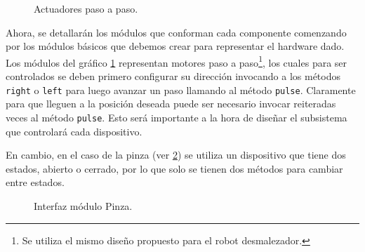 \begin{figure}[h]
\caption{Actuadores paso a paso.}
\label{estructuraActuadores}
\begin{center}
\end{center}
\end{figure}
Ahora, se detallarán los módulos que conforman cada componente comenzando por los módulos básicos que debemos crear para representar el hardware dado. Los módulos del gráfico \ref{estructuraActuadores} representan motores paso a paso\footnote{Se utiliza el mismo diseño propuesto para el robot desmalezador\cite{paperPomponio}.}, los cuales para ser controlados se deben primero configurar su dirección invocando a los métodos \verb|right| o \verb|left| para luego avanzar un paso llamando al método \verb|pulse|. Claramente para que lleguen a la posición deseada puede ser necesario invocar reiteradas veces al método \verb|pulse|. Esto será importante a la hora de diseñar el subsistema que controlará cada dispositivo.

En cambio, en el caso de la pinza (ver \ref{moduloPinza}) se utiliza un dispositivo que tiene dos estados, abierto o cerrado, por lo que solo se tienen dos métodos para cambiar entre estados.

\begin{figure}[h!]
\caption{Interfaz módulo Pinza.}
\label{moduloPinza}
\begin{center}
\end{center}
\end{figure}

